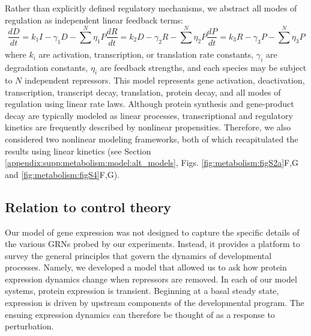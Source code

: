 Rather than explicitly defined regulatory mechanisms, we abstract all modes of regulation as independent linear feedback terms:
\begin{equation}
\frac{dD}{dt}=k_1I-\gamma_1D - \sum\limits_{}^{N} \eta_{1}P
\frac{dR}{dt}=k_2D-\gamma_2R - \sum\limits_{}^{N} \eta_{2}P
\frac{dP}{dt}=k_3R-\gamma_3P - \sum\limits_{}^{N} \eta_{3}P
\end{equation}
where $k_i$ are activation, transcription, or translation rate constants, $\gamma_i$ are degradation constants, $\eta_i$ are feedback strengths, and each species may be subject to $N$ independent repressors. This model represents gene activation, deactivation, transcription, transcript decay, translation, protein decay, and all modes of regulation using linear rate laws. Although protein synthesis and gene-product decay are typically modeled as linear processes, transcriptional and regulatory kinetics are frequently described by nonlinear propensities. Therefore, we also considered two nonlinear modeling frameworks, both of which recapitulated the results using linear kinetics (see Section \ref{appendix:supp:metabolism:model:alt_models}, Figs. \ref{fig:metabolism:figS2a}F,G and \ref{fig:metabolism:figS4}F,G).

\subsection{Relation to control theory}
\label{appendix:supp:metabolism:model:controls}

Our model of gene expression was not designed to capture the specific details of the various GRNs probed by our experiments. Instead, it provides a platform to survey the general principles that govern the dynamics of developmental processes. Namely, we developed a model that allowed us to ask how protein expression dynamics change when repressors are removed. In each of our model systems, protein expression is transient. Beginning at a basal steady state, expression is driven by upstream components of the developmental program. The ensuing expression dynamics can therefore be thought of as a response to perturbation. 

